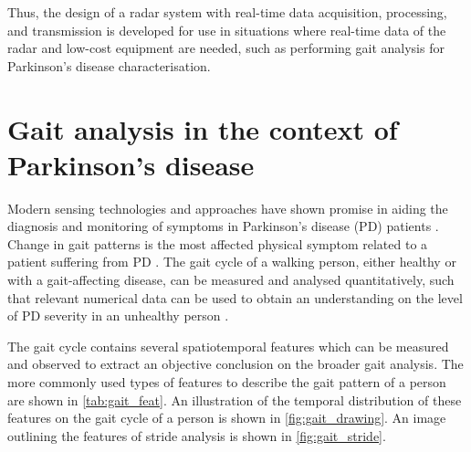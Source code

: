 	Thus, the design of a radar system with real-time data acquisition, processing, and transmission is developed for use in situations where real-time data of the radar and low-cost equipment are needed, such as performing gait analysis for Parkinson's disease characterisation.
	
	\section{Gait analysis in the context of Parkinson's disease} \label{sec:gait_analysis}
	
	Modern sensing technologies and approaches have shown promise in aiding the diagnosis and monitoring of symptoms in Parkinson's disease (PD) patients \cite{Biase2020}. Change in gait patterns is the most affected physical symptom related to a patient suffering from PD \cite{Zanardi2021}. The gait cycle of a walking person, either healthy or with a gait-affecting disease, can be measured and analysed quantitatively, such that relevant numerical data can be used to obtain an understanding on the level of PD severity in an unhealthy person \cite{Zanardi2021}.
	
	The gait cycle contains several spatiotemporal features which can be measured and observed to extract an objective conclusion on the broader gait analysis. The more commonly used types of features to describe the gait pattern of a person are shown in \cref{tab:gait_feat}. An illustration of the temporal distribution of these features on the gait cycle of a person is shown in \cref{fig:gait_drawing}. An image outlining the features of stride analysis is shown in \cref{fig:gait_stride}.
	
